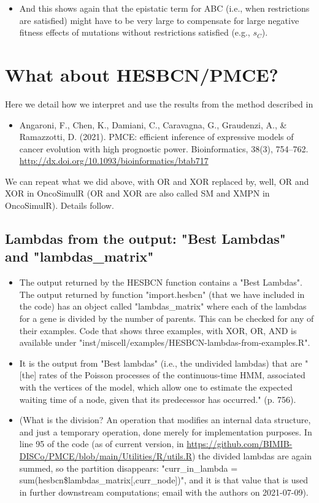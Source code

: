 \documentclass[11pt]{article}
\begin{document}
\begin{itemize}
\begin{itemize}
\item And this shows again that the epistatic term for ABC (i.e., when restrictions are satisfied) might have to be very large to compensate for large negative fitness effects of mutations without restrictions satisfied (e.g., \(s_C\)).
\end{itemize}
\end{itemize}





\section{What about HESBCN/PMCE?}
\label{sec:org1904b6b}
Here we detail how we interpret and use the results from the method described in 

\begin{itemize}
\item Angaroni, F., Chen, K., Damiani, C., Caravagna, G., Graudenzi, A., \& Ramazzotti, D. (2021). PMCE: efficient inference of expressive models of cancer evolution with high prognostic power. Bioinformatics, 38(3), 754–762. \url{http://dx.doi.org/10.1093/bioinformatics/btab717}
\end{itemize}

We can repeat what we did above, with OR and XOR replaced by, well, OR and XOR in OncoSimulR (OR and XOR are also called SM and XMPN in OncoSimulR). Details follow.

\subsection{Lambdas from the output: "Best Lambdas" and "lambdas\_matrix"}
\label{sec:orgd732357}
\begin{itemize}
\item The output returned by the HESBCN function contains a "Best Lambdas". The output returned by function "import.hesbcn" (that we have included in the code) has an object called "lambdas\_matrix" where each of the lambdas for a gene is divided by the number of parents. This can be checked for any of their examples. Code that shows three examples, with XOR, OR, AND is available under "inst/miscell/examples/HESBCN-lambdas-from-examples.R".
\item It is the output from "Best lambdas" (i.e., the undivided lambdas) that are "[the] rates of the Poisson processes of the continuous-time HMM, associated with the vertices of the model, which allow one to estimate the expected waiting time of a node, given that its predecessor has occurred." (p. 756).
\item (What is the division? An  operation that modifies an internal data structure, and just a temporary operation, done merely for implementation purposes. In line 95 of the code (as of current version, in \url{https://github.com/BIMIB-DISCo/PMCE/blob/main/Utilities/R/utils.R}) the divided lambdas are again summed, so the partition disappears: "curr\_in\_lambda = sum(hesbcn\$lambdas\_matrix[,curr\_node])", and it is that value that is used in further downstream computations;  email with the authors on 2021-07-09).
\end{itemize}
\end{document}

